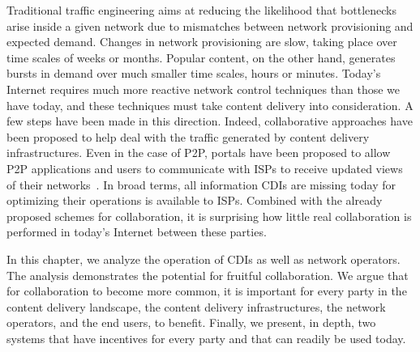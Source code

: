 Traditional traffic engineering aims at reducing the likelihood that
bottlenecks arise inside a given network due to mismatches between network
provisioning and expected demand. Changes in network provisioning are slow,
taking place over time scales of weeks or months. Popular content, on the other
hand, generates bursts in demand over much smaller time scales, \eg hours or
minutes. Today's Internet requires much more reactive network control
techniques than those we have today, and these techniques must take content
delivery into consideration. A few steps have been made in this direction.
Indeed, collaborative approaches
\cite{TECDN,CooperativeSettlement:ToN,Cate-CCR} have been proposed to help deal
with the traffic generated by content delivery infrastructures. Even in the
case of P2P, portals have been proposed to allow P2P applications and users to
communicate with ISPs to receive updated views of their networks~\cite{p4p}. In
broad terms, all information CDIs are missing today for optimizing their
operations is available to ISPs. Combined with the already proposed schemes for
collaboration, it is surprising how little real collaboration is performed in
today's Internet between these parties.

In this chapter, we analyze the operation of CDIs as well as network operators.
The analysis demonstrates the potential for fruitful collaboration.  We argue
that for collaboration to become more common, it is important for every party
in the content delivery landscape, \ie the content delivery infrastructures,
the network operators, and the end users, to benefit.  Finally, we present, in
depth, two systems that have incentives for every party and that can readily be
used today.

